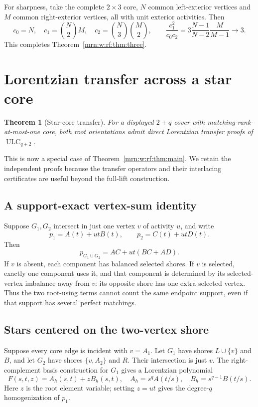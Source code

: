 \documentclass[11pt,a4paper]{article}
\newtheorem{theorem}{Theorem}[section]
\theoremstyle{remark}\newtheorem{remark}[theorem]{Remark}
\newcommand{\ULC}{\operatorname{ULC}}      %
\begin{document}
For sharpness, take the complete $2\times3$ core, $N$ common left-exterior vertices and $M$ common right-exterior vertices, all with unit exterior activities. Then
\[
 c_0=N,\quad c_1=\binom N2M,\quad c_2=\binom N3\binom M2,
 \qquad
 \frac{c_1^2}{c_0c_2}=3\frac{N-1}{N-2}\frac{M}{M-1}\longrightarrow3.
\]
This completes Theorem~\ref{mrn:w:rf:thm:three}.
\section{Lorentzian transfer across a star core}\label{mrn:w:rf:sec:stars}
\begin{theorem}[Star-core transfer]\label{mrn:w:rf:thm:stars}
For a displayed $2+q$ cover with matching-rank-at-most-one core, both root orientations admit direct Lorentzian transfer proofs of $\ULC_{q+2}$.
\end{theorem}
This is now a special case of Theorem~\ref{mrn:w:rf:thm:main}. We retain the independent proofs because the transfer operators and their interlacing certificates are useful beyond the full-lift construction.
\subsection{A support-exact vertex-sum identity}
Suppose $G_1,G_2$ intersect in just one vertex $v$ of activity $u$, and write
\[
 p_1=A(t)+utB(t),\qquad p_2=C(t)+utD(t).
\]
Then
\begin{equation}\label{mrn:w:rf:eq:vertices}
 p_{G_1\cup G_2}=AC+ut(BC+AD).
\end{equation}
If $v$ is absent, each component has balanced selected shores. If $v$ is selected, exactly one component uses it, and that component is determined by its selected-vertex imbalance away from $v$: its opposite shore has one extra selected vertex. Thus the two root-using terms cannot count the same endpoint support, even if that support has several perfect matchings.

\subsection{Stars centered on the two-vertex shore}
Suppose every core edge is incident with $v=A_1$. Let $G_1$ have shores $L\cup\{v\}$ and $B$, and let $G_2$ have shores $\{v,A_2\}$ and $R$. Their intersection is just $v$. The right-complement basis construction for $G_1$ gives a Lorentzian polynomial
\[
 F(s,t,z)=A_h(s,t)+zB_h(s,t),
 \quad A_h=s^qA(t/s),\quad B_h=s^{q-1}B(t/s).
\]
Here $z$ is the root element variable; setting $z=ut$ gives the degree-$q$ homogenization of $p_1$.
\end{document}
